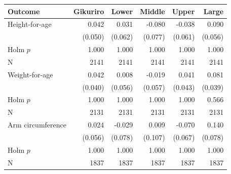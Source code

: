 \begin{tabular}{lrrrrr}
\toprule
Outcome & Gikuriro & Lower & Middle & Upper & Large \\
\midrule
Height-for-age & 0.042 & 0.031 & -0.080 & -0.038 & 0.090 \\
 & (0.050) & (0.062) & (0.077) & (0.061) & (0.056) \\
Holm $p$ & 1.000 & 1.000 & 1.000 & 1.000 & 1.000 \\
N & 2141 & 2141 & 2141 & 2141 & 2141 \\
Weight-for-age & 0.042 & 0.008 & -0.019 & 0.041 & 0.081 \\
 & (0.040) & (0.056) & (0.057) & (0.043) & (0.039) \\
Holm $p$ & 1.000 & 1.000 & 1.000 & 1.000 & 0.566 \\
N & 2131 & 2131 & 2131 & 2131 & 2131 \\
Arm circumference & 0.024 & -0.029 & 0.009 & -0.070 & 0.140 \\
 & (0.056) & (0.078) & (0.107) & (0.067) & (0.078) \\
Holm $p$ & 1.000 & 1.000 & 1.000 & 1.000 & 1.000 \\
N & 1837 & 1837 & 1837 & 1837 & 1837 \\
\bottomrule
\end{tabular}
